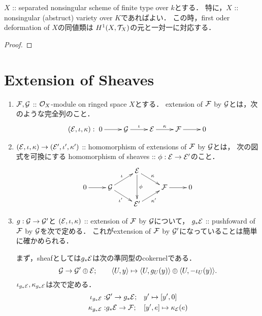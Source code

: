 \documentclass[a4paper]{jsarticle}
\begin{document}
    \begin{Thm}
        $X$ :: separated nonsingular scheme of finite type over $k$とする．
        特に，$X$ :: nonsingular (abstruct) variety over $K$であればよい．
        この時，first oder deformation of $X$の同値類は
        $H^1(X, \mathcal{T}_X)$の元と一対一に対応する．
    \end{Thm}
    \begin{proof}
    \end{proof}

\section{Extension of Sheaves}
    \begin{Def}
        \begin{enumerate}[label=(\roman*), leftmargin=*]
        \item
            $\mathcal{F}, \mathcal{G}$ :: $\mathcal{O}_X$-module on ringed space $X$とする．
            extension of $\mathcal{F}$ by $\mathcal{G}$とは，次のような完全列のこと．
            \[
            (\shE, \iota, \kappa):
                \xymatrix{
                    0 \ar[r]& \shG \ar[r]^-{\iota}& \shE \ar[r]^-{\kappa}& \shF \ar[r]& 0
            }\]

        \item
            $(\mathcal{E}, \iota, \kappa) \to (\mathcal{E}', \iota', \kappa')$
            :: homomorphism of extensions of $\mathcal{F}$ by $\mathcal{G}$とは，
            次の図式を可換にする
            homomorphism of sheaves :: $\phi: \mathcal{E} \to \mathcal{E}'$のこと．
            \[\xymatrix@R=10pt{
                    {}& {}& \shE \ar[dd]^-{\phi} \ar[rd]^-{\kappa}& {}& {} \\
                    0 \ar[r]& \shG \ar[ru]^-{\iota}\ar[rd]_-{\iota'}& {} & \shF \ar[r]& 0 \\
                    {}& {}& \shE' \ar[ru]_-{\kappa'}& {}& {}
            }\]
        
        \item
            $g: \mathcal{G} \to \mathcal{G}'$と
            $(\mathcal{E}, \iota, \kappa)$ :: extension of $\mathcal{F}$ by $\mathcal{G}$について，
            $g_* \mathcal{E}$ :: pushfoward of $\mathcal{F}$ by $\mathcal{G}$を次で定める．
            これがextension of $\mathcal{F}$ by $\mathcal{G}'$になっていることは簡単に確かめられる．

            まず，sheafとしては$g_* \mathcal{E}$は次の準同型のcokernelである．
            \[
                \mathcal{G} \to \mathcal{G}' \oplus \mathcal{E};
                \qquad
                \langle U,y \rangle \mapsto \langle U,g_U(y) \rangle \oplus \langle U,-\iota_U(y) \rangle.
            \]
            $\iota_{g_*\mathcal{E}}, \kappa_{g_*\mathcal{E}}$は次で定める．
            \begin{align*}
                \iota_{g_*\mathcal{E}}:& \mathcal{G}' \to g_*\mathcal{E}; && y' \mapsto [y', 0] \\
                \kappa_{g_*\mathcal{E}}:& g_*\mathcal{E} \to \mathcal{F}; && [y', e] \mapsto \kappa_{\mathcal{E}}(e)
            \end{align*}
    \end{enumerate}
    \end{Def}
\end{document}
